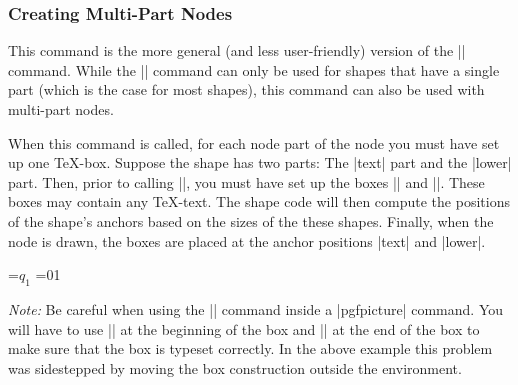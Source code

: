 \subsubsection{Creating Multi-Part Nodes}

\begin{command}{\pgfmultipartnode{}}
    This command is the more general (and less user-friendly) version of the
    |\pgfnode| command. While the |\pgfnode| command can only be used for
    shapes that have a single part (which is the case for most shapes), this
    command can also be used with multi-part nodes.

    When this command is called, for each node part of the node you must have
    set up one \TeX-box. Suppose the shape has two parts: The |text| part and
    the |lower| part. Then, prior to calling |\pgfmultipartnode|, you must have
    set up the boxes |\pgfnodeparttextbox| and |\pgfnodepartlowerbox|. These
    boxes may contain any \TeX-text. The shape code will then compute the
    positions of the shape's anchors based on the sizes of the these shapes.
    Finally, when the node is drawn, the boxes are placed at the anchor
    positions |text| and |lower|.
\begin{codeexample}[preamble={\usetikzlibrary{shapes}},pre={\begin{lateximage}},post={\end{lateximage}}]
\setbox\pgfnodeparttextbox=\hbox{$q_1$}
\setbox\pgfnodepartlowerbox=\hbox{01}
\begin{pgfpicture}
\end{pgfpicture}
\end{codeexample}

    \emph{Note:} Be careful when using the |\setbox| command inside a
    |{pgfpicture}| command. You will have to use |\pgfinterruptpath| at the
    beginning of the box and |\endpgfinterruptpath| at the end of the box to
    make sure that the box is typeset correctly. In the above example this
    problem was sidestepped by moving the box construction outside the
    environment.


\end{command}
